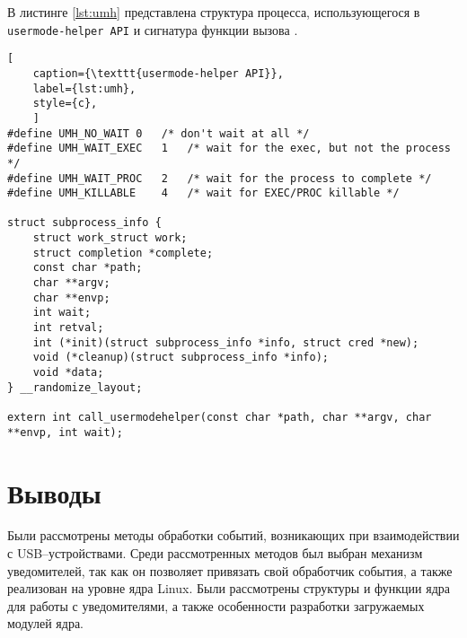 В листинге \ref{lst:umh} представлена структура процесса, использующегося в \texttt{usermode-helper API} и сигнатура функции вызова \cite{umh}.

\begin{lstlisting}[
	caption={\texttt{usermode-helper API}},
	label={lst:umh},
	style={c},
	]
#define UMH_NO_WAIT	0	/* don't wait at all */
#define UMH_WAIT_EXEC	1	/* wait for the exec, but not the process */
#define UMH_WAIT_PROC	2	/* wait for the process to complete */
#define UMH_KILLABLE	4	/* wait for EXEC/PROC killable */

struct subprocess_info {
	struct work_struct work;
	struct completion *complete;
	const char *path;
	char **argv;
	char **envp;
	int wait;
	int retval;
	int (*init)(struct subprocess_info *info, struct cred *new);
	void (*cleanup)(struct subprocess_info *info);
	void *data;
} __randomize_layout;

extern int call_usermodehelper(const char *path, char **argv, char **envp, int wait);
\end{lstlisting}

\section*{Выводы}

Были рассмотрены методы обработки событий, возникающих при взаимодействии с USB--устройствами. Среди рассмотренных методов был выбран механизм уведомителей, так как он позволяет привязать свой обработчик события, а также реализован на уровне ядра Linux. Были рассмотрены структуры и функции ядра для работы с уведомителями, а также особенности разработки загружаемых модулей ядра.